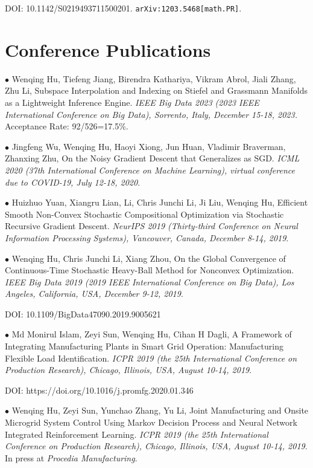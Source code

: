 \documentclass[margin,line]{res}
\begin{document}
\begin{resume}
DOI: 10.1142/S0219493711500201. \verb"arXiv:1203.5468[math.PR]". 


\section{\sc Conference Publications}

$\bullet$ Wenqing Hu, Tiefeng Jiang, Birendra Kathariya, Vikram Abrol, Jiali Zhang, Zhu Li, Subspace Interpolation and Indexing on Stiefel and Grassmann Manifolds as a Lightweight Inference Engine. \textit{IEEE Big Data 2023 (2023 IEEE International Conference on Big Data), Sorrento, Italy, December 15-18, 2023.} Acceptance Rate: 92/526=17.5\%.

$\bullet$ Jingfeng Wu, Wenqing Hu, Haoyi Xiong, Jun Huan, Vladimir Braverman, Zhanxing Zhu, On the Noisy Gradient Descent that Generalizes as SGD. \textit{ICML 2020 (37th International Conference on Machine Learning), virtual conference due to COVID-19, July 12-18, 2020}.

$\bullet$ Huizhuo Yuan, Xiangru Lian, Li, Chris Junchi Li, Ji Liu, Wenqing Hu, Efficient Smooth Non-Convex Stochastic Compositional Optimization via Stochastic Recursive Gradient Descent. \textit{NeurIPS 2019 (Thirty-third Conference on Neural Information Processing Systems), Vancouver, Canada, December 8-14, 2019}.

$\bullet$ Wenqing Hu, Chris Junchi Li, Xiang Zhou, On the Global Convergence of Continuous-Time Stochastic Heavy-Ball Method for Nonconvex Optimization. \textit{IEEE Big Data 2019 (2019 IEEE International Conference on Big Data), Los Angeles, California, USA, December 9-12, 2019}. 

DOI: 10.1109/BigData47090.2019.9005621

$\bullet$ Md Monirul Islam, Zeyi Sun, Wenqing Hu, Cihan H Dagli, A Framework of Integrating Manufacturing Plants in Smart Grid Operation: Manufacturing Flexible Load Identification. \textit{ICPR 2019 (the 25th International Conference on Production Research), Chicago, Illinois, USA, August 10-14, 2019}.

DOI: https://doi.org/10.1016/j.promfg.2020.01.346

$\bullet$ Wenqing Hu, Zeyi Sun, Yunchao Zhang, Yu Li, Joint Manufacturing and Onsite Microgrid System Control Using Markov Decision Process and Neural Network Integrated Reinforcement Learning. \textit{ICPR 2019 (the 25th International Conference on Production Research), Chicago, Illinois, USA, August 10-14, 2019}.
In press at \textit{Procedia Manufacturing}.


\end{resume}
\end{document}

